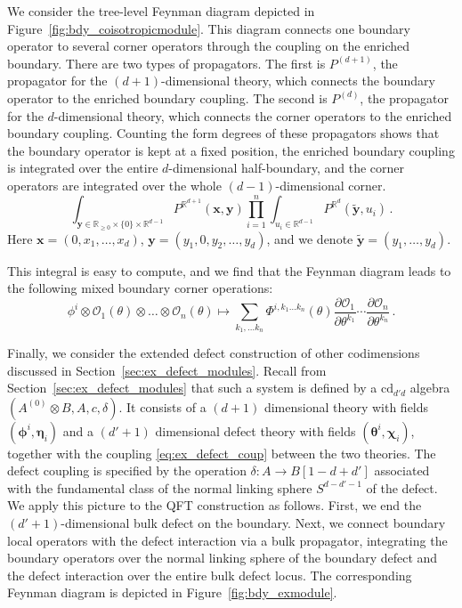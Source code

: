 \documentclass[11pt]{article}
\newcommand{\R}{\mathbb{R}}
\numberwithin{equation}{section}
\begin{document}
We consider the tree-level Feynman diagram depicted in Figure~\ref{fig:bdy_coisotropicmodule}. This diagram connects one boundary operator to several corner operators through the coupling on the enriched boundary. There are two types of propagators. The first is $P^{(d+1)}$, the propagator for the $(d+1)$-dimensional theory, which connects the boundary operator to the enriched boundary coupling. The second is $P^{(d)}$, the propagator for the $d$-dimensional theory, which connects the corner operators to the enriched boundary coupling. Counting the form degrees of these propagators shows that the boundary operator is kept at a fixed position, the enriched boundary coupling is integrated over the entire $d$-dimensional half-boundary, and the corner operators are integrated over the whole $(d-1)$-dimensional corner. 
\begin{equation}
	\int_{\boldsymbol{y} \in \R_{\geq 0}\times\{0\}\times\R^{d-1}} P^{\R^{d+1}}(\boldsymbol{x},\boldsymbol{y})\prod_{i = 1}^n\int_{u_i \in \R^{d-1}}P^{\R^{d}}(\tilde{\boldsymbol{y}},u_i)\,.
\end{equation}
Here $\boldsymbol{x} = (0,x_1,\dots,x_d)$, $\boldsymbol{y} = (y_1,0,y_2,\dots,y_{d})$, and we denote $\tilde{\boldsymbol{y}} = (y_1,\dots,y_{d})$.

This integral is easy to compute, and we find that the Feynman diagram leads to the following mixed boundary corner operations:
\begin{equation}
    \phi^i\otimes \mathcal{O}_1(\theta)\otimes \dots \otimes \mathcal{O}_n(\theta)  \mapsto \sum_{k_1, \dots k_n}  \Phi^{i,k_1\dots k_n}(\theta)\frac{\partial \mathcal{O}_1}{\partial \theta^{k_1}}\cdots\frac{\partial \mathcal{O}_n}{\partial \theta^{k_n}} \,.
\end{equation} 




Finally, we consider the extended defect construction of other codimensions discussed in Section~\ref{sec:ex_defect_modules}. Recall from Section~\ref{sec:ex_defect_modules} that such a system is defined by a $\mathrm{cd}_{d'd}$ algebra $(A^{(0)}\otimes B,A,c,\delta)$. It consists of a $(d+1)$ dimensional theory with fields $(\boldsymbol{\phi}^i,\boldsymbol{\eta}_i)$ and a $(d'+1)$ dimensional defect theory with fields $(\boldsymbol{\theta}^i,\boldsymbol{\chi}_i)$, together with the coupling \eqref{eq:ex_defect_coup} between the two theories. The defect coupling is specified by the operation $\delta:A\to B[1-d + d']$ associated with the fundamental class of the normal linking sphere $S^{d-d'-1}$ of the defect. We apply this picture to the QFT construction as follows. First, we end the $(d'+1)$-dimensional bulk defect on the boundary. Next, we connect boundary local operators with the defect interaction via a bulk propagator, integrating the boundary operators over the normal linking sphere of the boundary defect and the defect interaction over the entire bulk defect locus. The corresponding Feynman diagram is depicted in Figure~\ref{fig:bdy_exmodule}.
\end{document}
